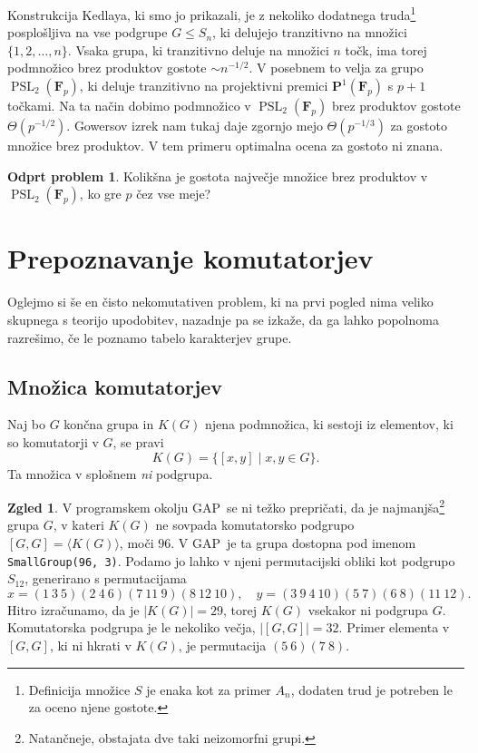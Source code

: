 \documentclass[11pt]{book}
\def\FF{\mathbf{F}}
\def\PP{\mathbf{P}}
\DeclareMathOperator\PSL{PSL}
\theoremstyle{definition}
\theoremstyle{zgled}
\newtheorem{zgled}[theorem]{Zgled}
\theoremstyle{zgledbrezstevilke}
\theoremstyle{odprtproblem}
\newtheorem{odprtproblem}[theorem]{Odprt problem}
\theoremstyle{domacanaloga}
\theoremstyle{izrek}
\begin{document}
Konstrukcija Kedlaya, ki smo jo prikazali, je z nekoliko dodatnega truda\footnote{Definicija množice $S$ je enaka kot za primer $A_n$, dodaten trud je potreben le za oceno njene gostote.} posplošljiva na vse podgrupe $G \leq S_n$, ki delujejo tranzitivno na množici $\{ 1,2,\dots, n\}$. Vsaka grupa, ki tranzitivno deluje na množici $n$ točk, ima torej podmnožico brez produktov gostote $\sim n^{-1/2}$. V posebnem to velja za grupo $\PSL_2(\FF_p)$, ki deluje tranzitivno na projektivni premici $\PP^1(\FF_p)$ s $p+1$ točkami. Na ta način dobimo podmnožico v $\PSL_2(\FF_p)$ brez produktov gostote $\Theta(p^{-1/2})$. Gowersov izrek nam tukaj daje zgornjo mejo $\Theta(p^{-1/3})$ za gostoto množice brez produktov. V tem primeru optimalna ocena za gostoto ni znana.

\begin{odprtproblem}
Kolikšna je gostota največje množice brez produktov v $\PSL_2(\FF_p)$, ko gre $p$ čez vse meje?
\end{odprtproblem}

\section{Prepoznavanje komutatorjev}

Oglejmo si še en čisto nekomutativen problem, ki na prvi pogled nima veliko skupnega s teorijo upodobitev, nazadnje pa se izkaže, da ga lahko popolnoma razrešimo, če le poznamo tabelo karakterjev grupe.

\subsection{Množica komutatorjev}

Naj bo $G$ končna grupa in $K(G)$ njena podmnožica, ki sestoji iz elementov, ki so komutatorji v $G$, se pravi
\[
    K(G) = \{ [x,y] \mid x,y \in G \}.
\]
Ta množica v splošnem \emph{ni} podgrupa.

\begin{zgled}
V programskem okolju GAP~se ni težko prepričati, da je najmanjša\footnote{Natančneje, obstajata dve taki neizomorfni grupi.} grupa $G$, v kateri $K(G)$ ne sovpada komutatorsko podgrupo $[G,G] = \langle K(G) \rangle$, moči $96$. V GAP~je ta grupa dostopna pod imenom \texttt{SmallGroup(96, 3)}. Podamo jo lahko v njeni permutacijski obliki kot podgrupo $S_{12}$, generirano s permutacijama
\[
    x = (1 \ 3 \ 5)(2 \ 4 \ 6)(7 \ 11 \ 9)(8 \ 12 \ 10), \quad
    y = (3 \ 9 \ 4 \ 10)(5 \ 7)(6 \ 8)(11 \ 12).
\]
Hitro izračunamo, da je $|K(G)| = 29$, torej $K(G)$ vsekakor ni podgrupa $G$. Komutatorska podgrupa je le nekoliko večja, $|[G,G]| = 32$. Primer elementa v $[G,G]$, ki ni hkrati v $K(G)$, je permutacija $(5 \ 6)(7 \ 8)$. 
\end{zgled}
\end{document}
